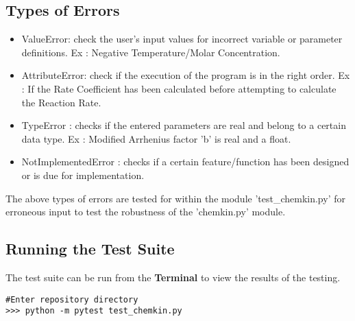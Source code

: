 \subsection{Types of Errors}
\begin{itemize}
    \item ValueError: check the user's input values for incorrect variable or parameter definitions. Ex : Negative Temperature/Molar Concentration. 
    \item AttributeError: check if the execution of the program is in the right order. Ex : If the Rate Coefficient has been calculated before attempting to calculate the Reaction Rate.
    \item TypeError : checks if the entered parameters are real and belong to a certain data type. Ex : Modified Arrhenius factor 'b' is real and a float.
    \item NotImplementedError : checks if a certain feature/function has been designed or is due for implementation.
\end{itemize}
The above types of errors are tested for within the module 'test\_chemkin.py' for erroneous input to test the robustness of the 'chemkin.py' module.
\subsection{Running the Test Suite}
The test suite can be run from the \textbf{Terminal} to view the results of the testing.
\begin{mdframed}[backgroundcolor=light-gray, roundcorner=10pt,leftmargin=1, rightmargin=5, innerleftmargin=10, innertopmargin=5,innerbottommargin=5, outerlinewidth=1, linecolor=light-gray]
\begin{lstlisting}
#Enter repository directory
>>> python -m pytest test_chemkin.py
\end{lstlisting}
\end{mdframed} 